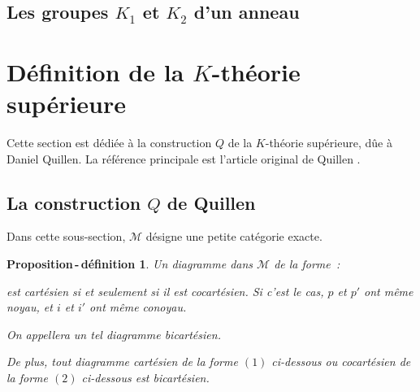\documentclass{amsart}
\theoremstyle{plain}
\newtheorem{propdefi}[theo]{Proposition\,-\,définition}
\theoremstyle{definition}
\theoremstyle{remark}
\newcommand{\M}{\mathcal{M}}
\begin{document}
\subsection{\texorpdfstring{Les groupes $K_1$ et $K_2$ d'un anneau}{Les groupes K1 et K2 d'un anneau}}

\section{\texorpdfstring{Définition de la $K$-théorie supérieure}{Définition de la K-théorie supérieure}}

Cette section est dédiée à la construction $Q$ de la $K$-théorie supérieure, dûe à Daniel Quillen. La référence principale est l'article
original de Quillen \cite{Quil}.

\subsection{\texorpdfstring{La construction $Q$ de Quillen}{La construction Q de Quillen}}

Dans cette sous-section, $\M$ désigne une petite catégorie exacte.

\begin{propdefi}\label{propBicartesien}
  Un diagramme dans $\M$ de la forme~:
  \begin{center}
  \end{center}
  est cartésien si et seulement si il est cocartésien. Si c'est le cas, $p$ et $p'$ ont même noyau, et $i$ et $i'$ ont même conoyau.
  
  On appellera un tel diagramme bicartésien.

  De plus, tout diagramme cartésien de la forme $(1)$ ci-dessous ou cocartésien de la forme $(2)$ ci-dessous est bicartésien.
  \begin{center}
  \end{center}
\end{propdefi}
\end{document}
